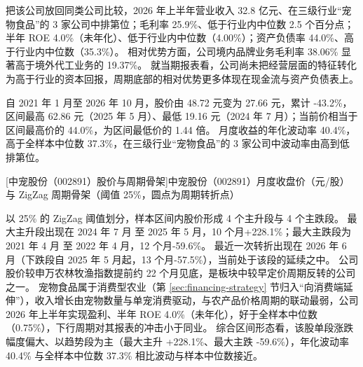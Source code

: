  把该公司放回同类公司比较，2026 年上半年营业收入 32.8 亿元、在三级行业“宠物食品”的 3 家公司中排第位；毛利率 25.9\%、低于行业内中位数 2.5 个百分点；半年 ROE 4.0\%（未年化）、低于行业内中位数（4.00\%）；资产负债率 44.0\%、高于行业内中位数（35.3\%）。 相对优势方面，公司境内品牌业务毛利率 38.06\% 显著高于境外代工业务的 19.37\%。 就当期报表看，公司尚未把经营层面的特征转化为高于行业的资本回报，周期底部的相对优势更多体现在现金流与资产负债表上。

 自 2021 年 1 月至 2026 年 10 月，股价由 48.72 元变为 27.66 元，累计 -43.2\%，区间最高 62.86 元（2025 年 5 月）、最低 19.16 元（2024 年 7 月）；当前价相当于区间最高价的 44.0\%，为区间最低价的 1.44 倍。 月度收益的年化波动率 40.4\%，高于全样本中位数 37.3\%，在三级行业“宠物食品”的 3 家公司中波动率由高到低排第位。

\begin{center}
\begin{minipage}{\textwidth}\centering
{}

[中宠股份（002891）股价与周期骨架]{中宠股份（002891）月度收盘价（元/股）与 ZigZag 周期骨架（阈值 25\%，圆点为周期转折点）}
\end{minipage}
\end{center}

 以 25\% 的 ZigZag 阈值划分，样本区间内股价形成 4 个主升段与 4 个主跌段。 最大主升段出现在 2024 年 7 月 至 2025 年 5 月，10 个月+228.1\%；最大主跌段为 2021 年 4 月 至 2022 年 4 月，12 个月-59.6\%。 最近一次转折出现在 2026 年 6 月（下跌段自 2025 年 5 月起，13 个月-57.5\%），当前处于该段的延续之中。 公司股价较申万农林牧渔指数提前约 22 个月见底，是板块中较早定价周期反转的公司之一。 宠物食品属于消费型农业（第 \ref{sec:financing-strategy} 节归入“向消费端延伸”），收入增长由宠物数量与单宠消费驱动，与农产品价格周期的联动最弱，公司 2026 年上半年实现盈利、半年 ROE 4.0\%（未年化），好于全样本中位数（0.75\%），下行周期对其报表的冲击小于同业。 综合区间形态看，该股单段涨跌幅度偏大、以趋势段为主（最大主升 +228.1\%、最大主跌 -59.6\%），年化波动率 40.4\% 与全样本中位数 37.3\% 相比波动与样本中位数接近。

